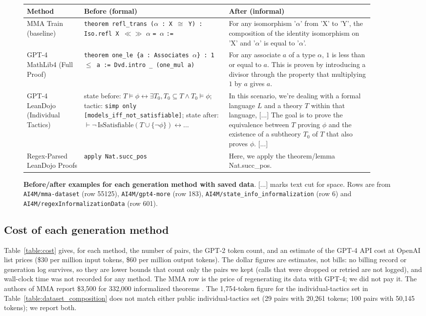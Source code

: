 \documentclass{article} %
\begin{document}
\begin{figure}[htbp]
\centering
\begin{tabular}{|p{0.15\linewidth}|p{0.38\linewidth}|p{0.38\linewidth}|}
\hline
\textbf{Method} & \textbf{Before (formal)} & \textbf{After (informal)} \\
\hline
MMA Train (baseline) & \texttt{theorem refl\_trans (}$\alpha$\texttt{ : X }$\cong$\texttt{ Y) : Iso.refl X }$\ll\gg$ $\alpha$ \texttt{= }$\alpha$ \texttt{:=} & For any isomorphism '$\alpha$' from 'X' to 'Y', the composition of the identity isomorphism on 'X' and '$\alpha$' is equal to '$\alpha$'. \\
\hline
GPT-4 MathLib4 (Full Proof) & \texttt{theorem one\_le \{a : Associates }$\alpha$\texttt{\} : 1 }$\leq$\texttt{ a := Dvd.intro \_ (one\_mul a)} & For any associate $a$ of a type $\alpha$, $1$ is less than or equal to $a$. This is proven by introducing a divisor through the property that multiplying $1$ by $a$ gives $a$. \\
\hline
GPT-4 LeanDojo (Individual Tactics) & state before: $T \models \phi \leftrightarrow \exists T_0, T_0 \subseteq T \wedge T_0 \models \phi$; tactic: \texttt{simp only [models\_iff\_not\_satisfiable]}; state after: $\vdash \neg\,\mathrm{IsSatisfiable}(T \cup \{\neg\phi\}) \leftrightarrow \dots$ & In this scenario, we're dealing with a formal language $L$ and a theory $T$ within that language, [...] The goal is to prove the equivalence between $T$ proving $\phi$ and the existence of a subtheory $T_0$ of $T$ that also proves $\phi$. [...] \\
\hline
Regex-Parsed LeanDojo Proofs & \texttt{apply Nat.succ\_pos} & Here, we apply the theorem/lemma Nat.succ\_pos. \\
\hline
\end{tabular}
\caption{\textbf{Before/after examples for each generation method with saved data}. [...] marks text cut for space. Rows are from \texttt{AI4M/mma-dataset} (row 55125), \texttt{AI4M/gpt4-more} (row 183), \texttt{AI4M/state\_info\_informalization} (row 6) and \texttt{AI4M/regexInformalizationData} (row 601).}
\label{fig:examples}
\end{figure}

\subsection{Cost of each generation method}
Table~\ref{table:cost} gives, for each method, the number of pairs, the GPT-2 token count, and an estimate of the GPT-4 API cost at OpenAI list prices (\$30 per million input tokens, \$60 per million output tokens). The dollar figures are estimates, not bills: no billing record or generation log survives, so they are lower bounds that count only the pairs we kept (calls that were dropped or retried are not logged), and wall-clock time was not recorded for any method. The MMA row is the price of regenerating its data with GPT-4; we did not pay it. The authors of MMA report \$3,500 for 332,000 informalized theorems \citep{mma}. The 1,754-token figure for the individual-tactics set in Table~\ref{table:dataset_composition} does not match either public individual-tactics set (29 pairs with 20,261 tokens; 100 pairs with 50,145 tokens); we report both.
\end{document}
